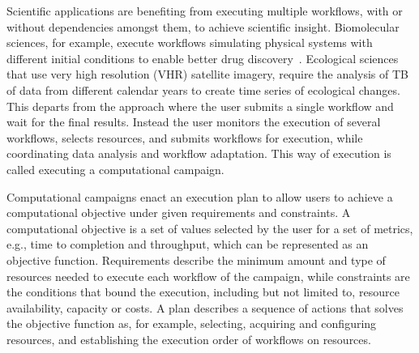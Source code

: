 Scientific applications are benefiting from executing multiple workflows, with or without dependencies amongst them, to achieve scientific insight.
Biomolecular sciences, for example, execute workflows simulating physical systems with different initial conditions to enable better drug discovery~\cite{dakka2018concurrent}.
Ecological sciences that use very high resolution (VHR) satellite imagery, require the analysis of TB of data from different calendar years to create time series of ecological changes.
This departs from the approach where the user submits a single workflow and wait for the final results.
Instead the user monitors the execution of several workflows, selects resources, and submits workflows for execution, while coordinating data analysis and workflow adaptation.
This way of execution is called executing a computational campaign.

Computational campaigns enact an execution plan to allow users to achieve a computational objective under given requirements and constraints.
A computational objective is a set of values selected by the user for a set of metrics, e.g., time to completion and throughput, which can be represented as an objective function.
Requirements describe the minimum amount and type of resources needed to execute each workflow of the campaign, while constraints are the conditions that bound the execution, including but not limited to, resource availability, capacity or costs.
A plan describes a sequence of actions that solves the objective function as, for example, selecting, acquiring and configuring resources, and establishing the execution order of workflows on resources.


